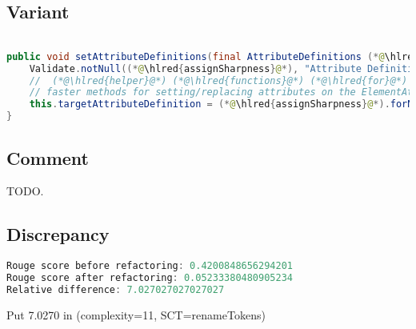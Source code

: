 \documentclass[11pt]{article}
\DeclareRobustCommand{\hlred}[1]{{\sethlcolor{YellowOrange}\hl{#1}}}
\begin{document}
\subsection{Variant}

\begin{lstlisting}[language=java]

public void setAttributeDefinitions(final AttributeDefinitions (*@\hlred{assignSharpness}@*)) {
    Validate.notNull((*@\hlred{assignSharpness}@*), "Attribute Definitions cannot be null");
    //  (*@\hlred{helper}@*) (*@\hlred{functions}@*) (*@\hlred{for}@*) (*@\hlred{implementing}@*) (*@\hlred{a}@*) (*@\hlred{subclass}@*) (*@\hlred{and}@*) (*@\hlred{providing}@*) (*@\hlred{a}@*) (*@\hlred{lot}@*) to (*@\hlred{provide}@*) (*@\hlred{for}@*) (*@\hlred{simplicity}@*) (*@\hlred{and}@*) (*@\hlred{for}@*)
    // faster methods for setting/replacing attributes on the ElementAttributes implementation
    this.targetAttributeDefinition = (*@\hlred{assignSharpness}@*).forName(getTemplateMode(), this.targetAttrCompleteName);
}
\end{lstlisting}

\subsection{Comment}

TODO.

\subsection{Discrepancy}

\begin{lstlisting}[language=java]
Rouge score before refactoring: 0.4200848656294201
Rouge score after refactoring: 0.05233380480905234
Relative difference: 7.027027027027027
\end{lstlisting}

Put 7.0270 in (complexity=11, SCT=renameTokens)
\end{document}
